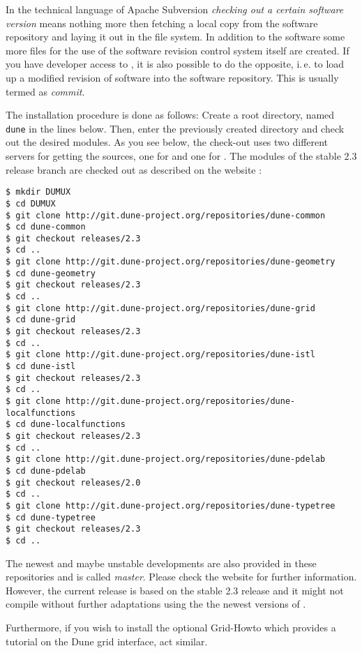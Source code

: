 In the technical language of Apache Subversion \emph{checking out a certain software version} means nothing more then fetching
a local copy from the software repository and laying it out in the file system.
In addition to the software some more files for the use of the software revision
control system itself are created. If you have developer access to \Dumux, it is
also possible to do the opposite, i.\,e. to load up a modified revision of software
into the software repository. This is usually termed as \emph{commit}.

The installation procedure is done as follows:
Create a  {\Dune} root directory, named \texttt{dune} in the lines below.
Then, enter the previously created directory and check out the desired modules.
As you see below, the check-out uses two different servers for getting the sources,
one for \Dune and one for {\Dumux}.
The \Dune modules of the stable 2.3 release branch are checked out as described
on the \Dune website \cite{DUNE-DOWNLOAD-GIT}:

\begin{lstlisting}[style=Bash]
$ mkdir DUMUX
$ cd DUMUX
$ git clone http://git.dune-project.org/repositories/dune-common
$ cd dune-common
$ git checkout releases/2.3
$ cd ..
$ git clone http://git.dune-project.org/repositories/dune-geometry
$ cd dune-geometry
$ git checkout releases/2.3
$ cd ..
$ git clone http://git.dune-project.org/repositories/dune-grid
$ cd dune-grid
$ git checkout releases/2.3
$ cd ..
$ git clone http://git.dune-project.org/repositories/dune-istl
$ cd dune-istl
$ git checkout releases/2.3
$ cd ..
$ git clone http://git.dune-project.org/repositories/dune-localfunctions
$ cd dune-localfunctions
$ git checkout releases/2.3
$ cd ..
$ git clone http://git.dune-project.org/repositories/dune-pdelab
$ cd dune-pdelab
$ git checkout releases/2.0
$ cd ..
$ git clone http://git.dune-project.org/repositories/dune-typetree
$ cd dune-typetree
$ git checkout releases/2.3
$ cd ..
\end{lstlisting}

The newest and maybe unstable developments are also provided in these repositories and is called \emph{master}.
Please check the \Dune website \cite{DUNE-DOWNLOAD-GIT} for further information. However, the current \Dumux release
is based on the stable 2.3 release and it might not compile without further adaptations using the the newest versions of \Dune.

Furthermore, if you wish to install the optional \Dune Grid-Howto which provides a tutorial
on the Dune grid interface, act similar.


